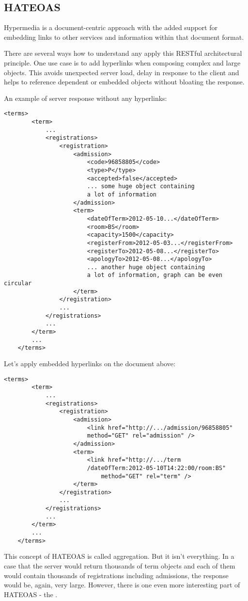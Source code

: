 	\subsection{HATEOAS}
	
	\cite[p.~11]{restful} Hypermedia is a document-centric approach with the added support for embedding links to other
	services and information within that document format.
	
	There are several ways how to understand any apply this RESTful architectural principle. One use case is to add
	hyperlinks when composing complex and large objects. This avoids unexpected server load, delay in response to the
	client and helps to reference dependent or embedded objects without bloating the response.
	
	An example of server response without any hyperlinks:
	
	\begin{lstlisting}[tabsize=2]
	<terms>
		<term>
			...
			<registrations>
				<registration>
					<admission>
						<code>96858805</code>
						<type>P</type>
						<accepted>false</accepted>
						... some huge object containing 
						a lot of information
					</admission>
					<term>
						<dateOfTerm>2012-05-10...</dateOfTerm>
						<room>BS</room>
						<capacity>1500</capacity>
						<registerFrom>2012-05-03...</registerFrom>
						<registerTo>2012-05-08...</registerTo>
						<apologyTo>2012-05-08...</apologyTo>
						... another huge object containing 
						a lot of information, graph can be even circular
					</term>
				</registration>
				...
			</registrations>
			...
		</term>
		...
	</terms>
	\end{lstlisting}
	
	Let's apply embedded hyperlinks on the document above:
	
	\begin{lstlisting}[tabsize=2]
	<terms>
		<term>
			...
			<registrations>
				<registration>
					<admission>
						<link href="http://.../admission/96858805" 
						method="GET" rel="admission" />
					</admission>
					<term>
						<link href="http://.../term
						/dateOfTerm:2012-05-10T14:22:00/room:BS"
							method="GET" rel="term" />
					</term>
				</registration>
				...
			</registrations>
			...
		</term>
		...
	</terms>
	\end{lstlisting}
	
	This concept of HATEOAS is called aggregation. But it isn't everything. In a case that the server would return
	thousands of term objects and each of them would contain thousands of registrations including admissions, the response
	would be, again, very large. However, there is one even more interesting part of HATEOAS - the .
	
